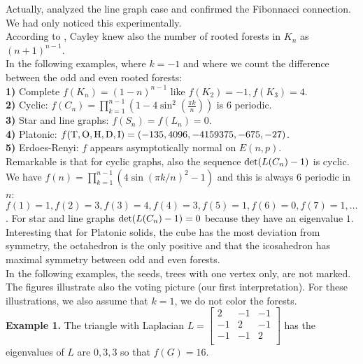 \documentclass[12pt]{amsart}
\theoremstyle{definition}
\begin{document}
Actually, \cite{Chebotarev2008} analyzed the line graph case and confirmed the 
Fibonnacci connection. We had only noticed this experimentally.  \\
According to \cite{Callan}, Cayley knew also the number of rooted forests in 
$K_n$ as $(n+1)^{n-1}$. \\

In the following examples, where $k=-1$ and where we count the difference between
the odd and even rooted forests: \\

{\bf 1)} Complete $f(K_n) = (1-n)^{n-1}$ like $f(K_2)=-1,f(K_3)=4$. \\
{\bf 2)} Cyclic: $f(C_n) = \prod_{k=1}^{n-1}(1-4 \sin^2(\frac{\pi k}{n}))$ is 6 periodic.  \\
{\bf 3)} Star and line graphs: $f(S_n) = f(L_n) =  0$. \\
{\bf 4)} Platonic: $f({\rm T,O,H,D,I})=(-135, 4096, -4159375, -675, -27)$. \\
{\bf 5)} Erdoes-Renyi: $f$ appears asymptotically normal on $E(n,p)$. \\

Remarkable is that for cyclic graphs, also the sequence ${{\rm det}}(L(C_n)-1)$ is cyclic. We have
$f(n) = \prod_{k=1}^{n-1} (4 \sin(\pi k/n)^2-1)$ and this is always $6$ periodic in $n$:
$f(1)=1,f(2)=3,f(3)=4,f(4)=3,f(5)=1,f(6)=0,f(7)=1, \dots$. 
For  star and line graphs ${{\rm det}}(L(C_n)-1)=0$ because they have an eigenvalue $1$.
Interesting that for Platonic solids, the cube has the most 
deviation from symmetry, the octahedron is the only positive 
and that the icosahedron has maximal symmetry between odd and even forests. \\

In the following examples, the seeds, trees with one vertex only, are not marked.
The figures illustrate also the voting picture (our first interpretation). 
For these illustrations, we also assume that $k=1$, we do not color the forests. \\

{\bf Example 1.}
The triangle with Laplacian
$L=\left[
\begin{array}{ccc}
 2 & -1 & -1 \\
 -1 & 2 & -1 \\
 -1 & -1 & 2 \\
\end{array} \right]$ has the eigenvalues of $L$ are $0,3,3$ so that $f(G)=16$. 

\begin{figure}
\end{figure}
\end{document}
